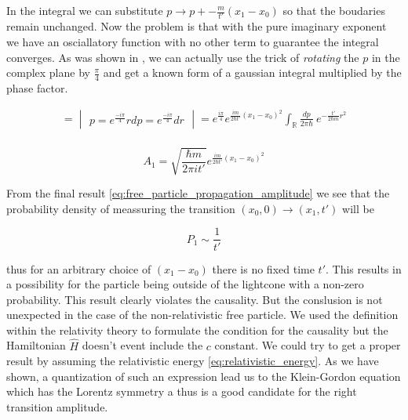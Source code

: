In the integral we can substitute $p \to p + - \frac{m}{t'}(x_{1} - x_{0})$ so that the boudaries remain unchanged. Now
the problem is that with the pure imaginary exponent we have an osciallatory function with no other term to guarantee
the integral converges. As was shown in \cite{imaginary_gaussian_integral}, we can actually use the trick of \textit{rotating}
the $p$ in the complex plane by $\frac{\pi}{4}$ and get a known form of a gaussian integral multiplied by the phase factor.

\begin{equation*}
    \begin{gathered}
        = \begin{vmatrix}
            p = e^{\frac{- i \pi}{4}} r
            dp = e^{\frac{- i \pi}{4}} dr
        \end{vmatrix}
        = e^{\frac{i \pi}{4}} e^{\frac{im}{2\hbar t'} (x_{1} - x_{0})^{2}} \int_{\mathbb{R}} \frac{dp}{2 \pi \hbar} \ e^{- \frac{t'}{2 \hbar m} r^{2}} \\
    \end{gathered}
\end{equation*}

\begin{equation}
    \label{eq:free_particle_propagation_amplitude}
    A_{1} = \sqrt{\frac{\hbar m}{2 \pi i t'}} e^{\frac{im}{2\hbar t'} (x_{1} - x_{0})^{2}}
\end{equation}

From the final result \ref{eq:free_particle_propagation_amplitude} we see that the probability density of meassuring the
transition $(x_{0}, 0) \to (x_{1}, t')$ will be

\begin{equation*}
    P_{1} \sim \frac{1}{t'}
\end{equation*}

thus for an arbitrary choice of $(x_{1} - x_{0})$ there is no fixed time $t'$. This results in a possibility for the particle
being outside of the lightcone with a non-zero probability. This result clearly violates the causality. But the conslusion is
not unexpected in the case of the non-relativistic free particle. We used the definition within the relativity theory to 
formulate the condition for the causality but the Hamiltonian $\hat{H}$ doesn't event include the $c$ constant. We could try
to get a proper result by assuming the relativistic energy \ref{eq:relativistic_energy}. As we have shown, a quantization of such an
expression lead us to the Klein-Gordon equation which has the Lorentz symmetry a thus is a good candidate for the right transition
amplitude.

